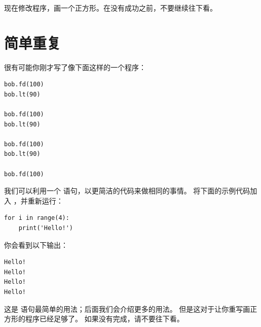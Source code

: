 
现在修改程序，画一个正方形。在没有成功之前，不要继续往下看。



\section{简单重复}
\label{repetition}


很有可能你刚才写了像下面这样的一个程序：

\begin{lstlisting}
bob.fd(100)
bob.lt(90)

bob.fd(100)
bob.lt(90)

bob.fd(100)
bob.lt(90)

bob.fd(100)
\end{lstlisting}


我们可以利用一个  语句，以更简洁的代码来做相同的事情。
将下面的示例代码加入  ，并重新运行：
    

\begin{lstlisting}
for i in range(4):
    print('Hello!')
\end{lstlisting}


你会看到以下输出：

\begin{lstlisting}
Hello!
Hello!
Hello!
Hello!
\end{lstlisting}


这是  语句最简单的用法；后面我们会介绍更多的用法。
但是这对于让你重写画正方形的程序已经足够了。 如果没有完成，请不要往下看。

